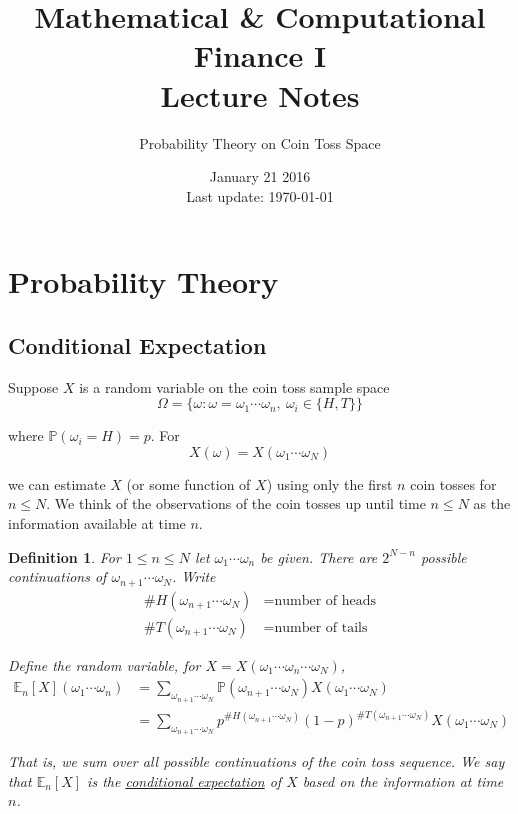 \documentclass[12pt]{article}
\newtheorem{definition}{Definition}
\newlength\tindent
\renewcommand{\indent}{\hspace*{\tindent}}
\renewcommand{\P}{\mathbb P}
\newcommand{\E}{\mathbb E}
\begin{document}
 
 
\title{Mathematical \& Computational Finance I\\Lecture Notes}
\author{Probability Theory on Coin Toss Space}
\date{January 21 2016 \\ Last update: \today{}}
\maketitle

\section{Probability Theory}

\subsection{Conditional Expectation}

Suppose $X$ is a random variable on the coin toss sample space 
\begin{equation*}
	\Omega = \{\omega:\omega = \omega_1\cdots\omega_n,~\omega_i \in \{H, T\}\}
\end{equation*}

where $\P(\omega_i = H) = p$. For 
\begin{equation*}
	X(\omega) = X(\omega_1\cdots\omega_N)
\end{equation*}

we can estimate $X$ (or some function of $X$) using only the first $n$ coin tosses for $n \leq N$. We think of the observations of the coin tosses up until time $n \leq N$ as the information available at time $n$.

\begin{definition} For $1 \leq n \leq N$ let $\omega_1\cdots\omega_n$ be given. There are $2^{N - n}$ possible continuations of $\omega_{n + 1}\cdots\omega_N$. Write
\begin{align*}
	\#H(\omega_{n + 1}\cdots\omega_N) &= \text{number of heads} \\
	\#T(\omega_{n + 1}\cdots\omega_N) &= \text{number of tails}
\end{align*}

Define the random variable, for $X = X(\omega_1\cdots\omega_n\cdots\omega_N)$,
\begin{align*}
	\E_n[X](\omega_1\cdots\omega_n) &= \sum_{\omega_{n + 1} \cdots \omega_N} \P(\omega_{n + 1}\cdots\omega_N) X(\omega_1\cdots\omega_N) \\
	&= \sum_{\omega_{n + 1}\cdots\omega_N} p^{\#H(\omega_{n + 1}\cdots\omega_N)}(1 - p)^{\#T(\omega_{n + 1}\cdots\omega_N)}X(\omega_1\cdots\omega_N)
\end{align*}

\indent That is, we sum over all possible continuations of the coin toss sequence. We say that $\E_n[X]$ is the \underline{conditional expectation} of $X$ based on the information at time $n$.
\end{definition}
\end{document}
